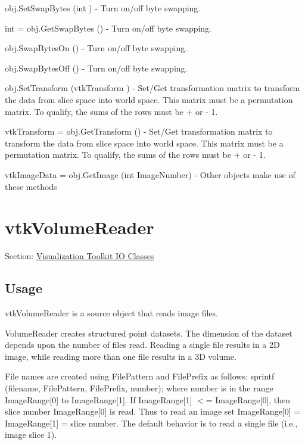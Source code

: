 \begin{DoxyItemize}
\item {\ttfamily obj.\-Set\-Swap\-Bytes (int )} -\/ Turn on/off byte swapping.  
\item {\ttfamily int = obj.\-Get\-Swap\-Bytes ()} -\/ Turn on/off byte swapping.  
\item {\ttfamily obj.\-Swap\-Bytes\-On ()} -\/ Turn on/off byte swapping.  
\item {\ttfamily obj.\-Swap\-Bytes\-Off ()} -\/ Turn on/off byte swapping.  
\item {\ttfamily obj.\-Set\-Transform (vtk\-Transform )} -\/ Set/\-Get transformation matrix to transform the data from slice space into world space. This matrix must be a permutation matrix. To qualify, the sums of the rows must be + or -\/ 1.  
\item {\ttfamily vtk\-Transform = obj.\-Get\-Transform ()} -\/ Set/\-Get transformation matrix to transform the data from slice space into world space. This matrix must be a permutation matrix. To qualify, the sums of the rows must be + or -\/ 1.  
\item {\ttfamily vtk\-Image\-Data = obj.\-Get\-Image (int Image\-Number)} -\/ Other objects make use of these methods  
\end{DoxyItemize}\hypertarget{vtkio_vtkvolumereader}{}\section{vtk\-Volume\-Reader}\label{vtkio_vtkvolumereader}
Section\-: \hyperlink{sec_vtkio}{Visualization Toolkit I\-O Classes} \hypertarget{vtkwidgets_vtkxyplotwidget_Usage}{}\subsection{Usage}\label{vtkwidgets_vtkxyplotwidget_Usage}
vtk\-Volume\-Reader is a source object that reads image files.

Volume\-Reader creates structured point datasets. The dimension of the dataset depends upon the number of files read. Reading a single file results in a 2\-D image, while reading more than one file results in a 3\-D volume.

File names are created using File\-Pattern and File\-Prefix as follows\-: sprintf (filename, File\-Pattern, File\-Prefix, number); where number is in the range Image\-Range\mbox{[}0\mbox{]} to Image\-Range\mbox{[}1\mbox{]}. If Image\-Range\mbox{[}1\mbox{]} $<$= Image\-Range\mbox{[}0\mbox{]}, then slice number Image\-Range\mbox{[}0\mbox{]} is read. Thus to read an image set Image\-Range\mbox{[}0\mbox{]} = Image\-Range\mbox{[}1\mbox{]} = slice number. The default behavior is to read a single file (i.\-e., image slice 1).

